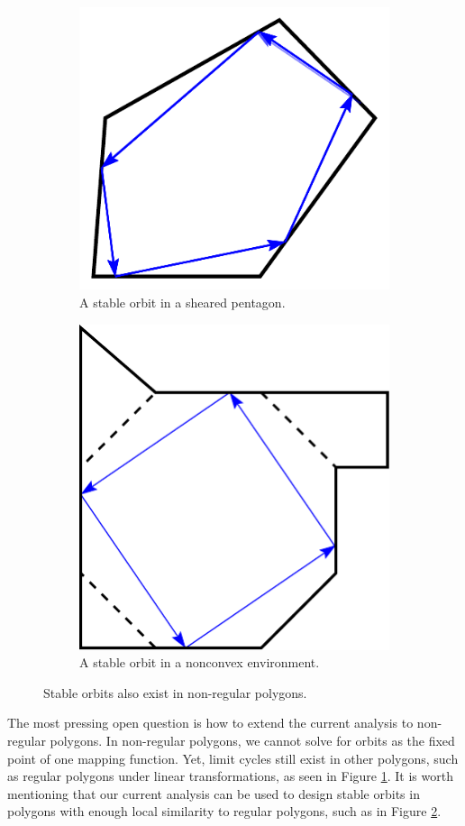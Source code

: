 \documentclass[letterpaper, 10 pt, conference]{ieeeconf}  %
\begin{document}
\begin{figure}
\begin{subfigure}{.25\textwidth}
\centering
\includegraphics[width=0.8\linewidth]{../figs/shear.pdf}
\caption{A stable orbit in a sheared pentagon.}
\label{shear}
\end{subfigure}%
\begin{subfigure}{0.25\textwidth}
\centering
\includegraphics[width=0.6\linewidth]{../figs/oct.pdf}
\caption{A stable orbit in a nonconvex environment.}
\label{oct}
\end{subfigure}
\caption{Stable orbits also exist in non-regular polygons. }
\label{squish-shear}
\end{figure}

The most pressing open question is how to extend the current analysis to 
non-regular polygons. In non-regular polygons, we cannot 
solve for orbits as the fixed point of one
mapping function. Yet, limit cycles still exist in other polygons, such as
regular polygons under linear transformations, as seen in Figure \ref{shear}.
It is worth mentioning that our current analysis can be used to design stable
orbits in polygons with enough local similarity to regular polygons, such
as in Figure \ref{oct}.
\end{document}
